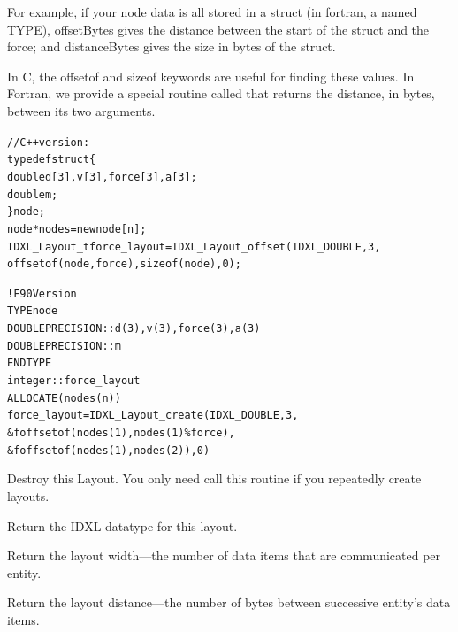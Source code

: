 For example, if your node data is all stored in a struct (in fortran, a named TYPE), offsetBytes gives the distance between the start of the struct and the force; and distanceBytes gives the size in bytes of the struct.  

In C, the offsetof and sizeof keywords are useful for finding these values.  In Fortran, we provide a special routine called  that returns the distance, in bytes, between its two arguments.

\begin{alltt}
// C++ version:
     typedef struct \{
        double d[3], v[3], force[3], a[3];
        double m;
     \} node;
     node *nodes=new node[n];
     IDXL\_Layout\_t force\_layout=IDXL\_Layout\_offset(IDXL\_DOUBLE,3,
              offsetof(node,force),sizeof(node),0);

! F90 Version
     TYPE node 
        DOUBLE PRECISION :: d(3), v(3), force(3), a(3)
        DOUBLE PRECISION :: m
     END TYPE
     integer :: force\_layout
     ALLOCATE(nodes(n))
     force\_layout=IDXL\_Layout\_create(IDXL\_DOUBLE,3,
   &          foffsetof(nodes(1),nodes(1)\%force),
   &          foffsetof(nodes(1),nodes(2)),0)
\end{alltt}



Destroy this Layout.  You only need call this routine if you repeatedly create layouts.


Return the IDXL datatype for this layout.


Return the layout width---the number of data items that are communicated
per entity.


Return the layout distance---the number of bytes between successive
entity's data items.



